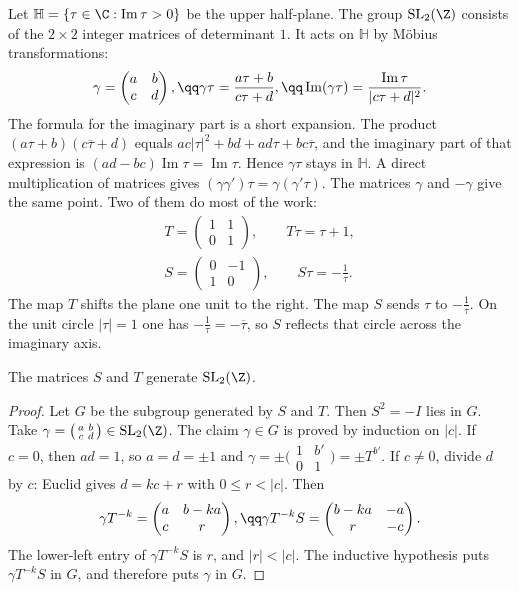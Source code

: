 Let $\mathbb H=\{\tau\in\C:\operatorname{Im}\tau>0\}$ be the upper half-plane. The group $\mathrm{SL}_2(\Z)$ consists of the $2\times2$ integer matrices of determinant $1$. It acts on $\mathbb H$ by Möbius transformations:
\[
\gamma=\begin{pmatrix}a&b\\c&d\end{pmatrix},\qq\gamma\tau=\frac{a\tau+b}{c\tau+d},\qq\operatorname{Im}(\gamma\tau)=\frac{\operatorname{Im}\tau}{|c\tau+d|^2}.
\]
The formula for the imaginary part is a short expansion. The product $(a\tau+b)(c\overline\tau+d)$ equals $ac|\tau|^2+bd+ad\tau+bc\overline\tau$, and the imaginary part of that expression is $(ad-bc)\operatorname{Im}\tau=\operatorname{Im}\tau$. Hence $\gamma\tau$ stays in $\mathbb H$. A direct multiplication of matrices gives $(\gamma\gamma')\tau=\gamma(\gamma'\tau)$. The matrices $\gamma$ and $-\gamma$ give the same point. Two of them do most of the work:
\[
\begin{gathered}T=\begin{pmatrix}1&1\\0&1\end{pmatrix},\qquad T\tau=\tau+1,\\S=\begin{pmatrix}0&-1\\1&0\end{pmatrix},\qquad S\tau=-\frac1\tau.\end{gathered}
\]
The map $T$ shifts the plane one unit to the right. The map $S$ sends $\tau$ to $-\frac1\tau$. On the unit circle $|\tau|=1$ one has $-\frac1\tau=-\overline\tau$, so $S$ reflects that circle across the imaginary axis.

\begin{proposition}\label{prop:generators}
The matrices $S$ and $T$ generate $\mathrm{SL}_2(\Z)$.
\end{proposition}

\begin{proof}
Let $G$ be the subgroup generated by $S$ and $T$. Then $S^2=-I$ lies in $G$. Take $\gamma=\bigl(\begin{smallmatrix}a&b\\c&d\end{smallmatrix}\bigr)\in\mathrm{SL}_2(\Z)$. The claim $\gamma\in G$ is proved by induction on $|c|$. If $c=0$, then $ad=1$, so $a=d=\pm1$ and $\gamma=\pm\bigl(\begin{smallmatrix}1&b'\\0&1\end{smallmatrix}\bigr)=\pm T^{b'}$.
If $c\ne0$, divide $d$ by $c$: Euclid gives $d=kc+r$ with $0\le r<|c|$. Then
\[
\gamma T^{-k}=\begin{pmatrix}a&b-ka\\c&r\end{pmatrix},\qq\gamma T^{-k}S=\begin{pmatrix}b-ka&-a\\r&-c\end{pmatrix}.
\]
The lower-left entry of $\gamma T^{-k}S$ is $r$, and $|r|<|c|$. The inductive hypothesis puts $\gamma T^{-k}S$ in $G$, and therefore puts $\gamma$ in $G$.
\end{proof}


